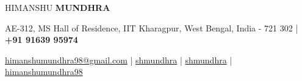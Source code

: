 \documentclass[10pt]{article}
\begin{document}
\begin{center}
    {\Huge HIMANSHU \textbf{MUNDHRA}}\\[0.5ex]
\end{center}
\vspace{-4.1ex}
\begin{center}
    {\small AE-312, MS Hall of Residence, IIT Kharagpur, West Bengal, India - 721 302 | \faMobile\hspace{0.2ex} \textbf{+91 91639 95974} }
\end{center}
\vspace{-4.1ex}
\begin{center}
    \Letter\hspace{0.2ex}
    \href{mailto:himanshumundhra98@gmail.com}{\small himanshumundhra98@gmail.com} | 
    \faLinkedinSquare\hspace{0.2ex}
    \href{https://www.linkedin.com/in/shmundhra/}{\small shmundhra} | 
    \faGithub\hspace{0.2ex}
    \href{https://github.com/shmundhra/}{\small shmundhra} | 
    \faMedium\hspace{0.2ex}
    \href{https://medium.com/@himanshumundhra98}{\small himanshumundhra98}
\end{center}
\end{document}
